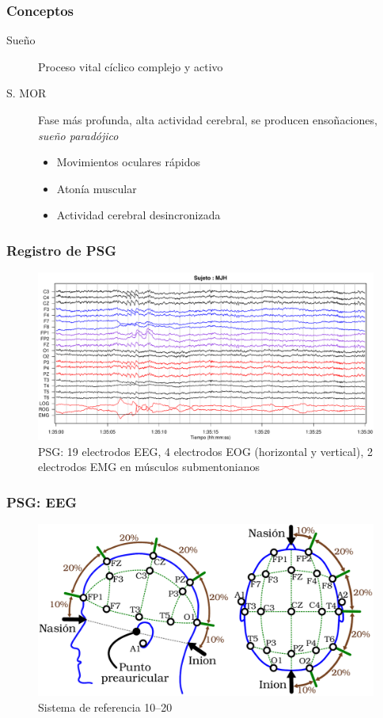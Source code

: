 \documentclass{beamer}
\begin{document}

\begin{frame}
\frametitle{Conceptos}
\begin{description}
\item[Sue\~no] Proceso vital c\'iclico complejo y activo
\item[S. MOR] Fase m\'as profunda, alta actividad cerebral, se producen enso\~naciones, 
\textit{sue\~no parad\'ojico}
\begin{itemize}
\item Movimientos oculares r\'apidos
\item Aton\'ia muscular
\item Actividad cerebral desincronizada
\end{itemize}
\end{description}
\end{frame}

\begin{frame}\frametitle{Registro de PSG}
\begin{figure}
\centering
\includegraphics[width=0.9\linewidth]{./img_ejemplos/MJH_190_PDG_lucirse_PSG.pdf}
\caption{PSG: 19 electrodos EEG, 4 electrodos EOG (horizontal y vertical), 2 electrodos EMG en 
m\'usculos submentonianos}
\end{figure}
\end{frame}


\begin{frame}\frametitle{PSG: EEG}
\begin{figure}
\centering
\includegraphics[width=0.9\linewidth]{./img_diagramas/cabeza_hecha.pdf} 
\caption{Sistema de referencia 10--20}
\end{figure}
\end{frame}
\end{document}
